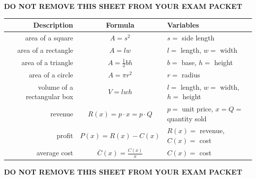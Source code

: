 \documentclass[11pt]{article}
\begin{document}
\begin{enumerate}

\newpage

\begin{center}
{\bf DO NOT REMOVE THIS SHEET FROM YOUR EXAM PACKET}
\end{center}

\begin{center}
    \begin{tabular}{ r | c | l }
    {\bf Description} & {\bf Formula} & {\bf Variables}\\
    \hline
    area of a square & $A=s^2$ & $s=$ side length\\
    \hline
    area of a rectangle & $A=lw$ & $l=$ length, $w=$ width\\
    \hline
    area of a triangle & $A=\frac12bh$ & $b=$ base, $h=$ height\\
    \hline
    area of a circle & $A=\pi r^2$ & $r=$ radius\\
    \hline
    volume of a rectangular box & $V=lwh$ & $l=$ length, $w=$ width, $h=$ height\\
    \hline
    revenue & $R(x) = p\cdot x = p\cdot Q$ & $p=$ unit price, $x=Q=$ quantity sold\\
    \hline
    profit & $P(x) = R(x) - C(x)$ & $R(x)=$ revenue, $C(x)=$ cost\\
    \hline
    average cost & $\overline C(x) = \frac{C(x)}{x}$ & $C(x)=$ cost\\
    \end{tabular}
\end{center}

\begin{center}
{\bf DO NOT REMOVE THIS SHEET FROM YOUR EXAM PACKET}
\end{center}


\end{enumerate}
\end{document}
